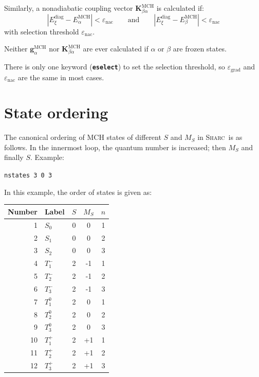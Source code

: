 \documentclass[a4paper,10pt,DIV=15,openany]{scrbook}
\newcommand{\sharc}{\textsc{Sharc}}
\newcommand{\ttt}[1]{\textbf{\texttt{#1}}}
\newcommand{\VEC}[1]{\ensuremath{\mathbf{#1}}}
\newenvironment{example}{
  \setlength{\OuterFrameSep}{3pt}
  \vspace{0mm}
  \definecolor{shadecolor}{HTML}{E4F4FF}
  \begin{shaded}
}{
  \end{shaded}
}
\begin{document}
Similarly, a nonadiabatic coupling vector $\VEC{K}^{\text{MCH}}_{\beta\alpha}$ is calculated if:
\begin{equation}
  \left|
    E^{\text{diag}}_\xi - E^{\text{MCH}}_\alpha
  \right|
  <
  \varepsilon_\text{nac}
  \qquad\text{and}\qquad
  \left|
    E^{\text{diag}}_\xi - E^{\text{MCH}}_\beta
  \right|
  <
  \varepsilon_\text{nac}
\end{equation}
with selection threshold $\varepsilon_\text{nac}$.

Neither $\VEC{g}^{\text{MCH}}_\alpha$ nor $\VEC{K}^{\text{MCH}}_{\beta\alpha}$ are ever calculated if $\alpha$ or $\beta$ are frozen states.

There is only one keyword (\ttt{eselect}) to set the selection threshold, so $\varepsilon_\text{grad}$ and $\varepsilon_\text{nac}$ are the same in most cases. 


\section{State ordering}\label{met:ordering}

The canonical ordering of MCH states of different $S$ and $M_S$ in \sharc\ is as follows. In the innermost loop, the quantum number is increased; then $M_S$ and finally $S$. Example:

\begin{example}
  \verb|nstates 3 0 3|
\end{example}

In this example, the order of states is given as:

\begin{tabular}{rlccc}
  \hline
  Number      &Label       &$S$ &$M_S$  &$n$\\
  \hline
  1&$S_0$       &0&0&1\\
  2&$S_1$       &0&0&2\\
  3&$S_2$       &0&0&3\\
  4&$T_1^-$       &2&-1&1\\
  5&$T_2^-$       &2&-1&2\\
  6&$T_3^-$       &2&-1&3\\
  7&$T_1^0$       &2&0&1\\
  8&$T_2^0$       &2&0&2\\
  9&$T_3^0$       &2&0&3\\
  10&$T_1^+$       &2&+1&1\\
  11&$T_2^+$       &2&+1&2\\
  12&$T_3^+$       &2&+1&3\\
  \hline
\end{tabular}
\end{document}
